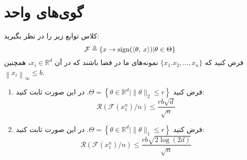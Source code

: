 \section{گوی‌های واحد}
کلاس توابع زیر را در نظر بگیرید:
$$\mathcal{F} \triangleq \{x \to \operatorname*{sign}(\langle\theta, \: x\rangle)| \theta \in \Theta\}$$
فرض کنید که 
$\{x_1. x_2, \hdots, x_n\}$
نمونه‌های ما در فضا باشند که در آن 
$x_i \in \mathbb{R}^d$،
همچنین
$\left\|x_{i}\right\|_{\infty} \leq b$.

\begin{enumerate}
\item 
فرض کنید 
$\Theta=\left\{\theta \in \mathbb{R}^{d} \big|\|\theta\|_{2} \leq r\right\}$.
در این صورت ثابت کنید:
$$\mathcal{R}(\mathcal{F}(x_1^n)/n) \leq \frac{rb\sqrt{d}}{\sqrt{n}}$$ 
\item 
فرض کنید
$\Theta=\left\{\theta \in \mathbb{R}^{d} \big|\|\theta\|_{1} \leq r\right\}$.
در این صورت ثابت کنید:
$$\mathcal{R}(\mathcal{F}(x_1^n)/n) \leq \frac{r b \sqrt{2 \log (2 d)}}{\sqrt{n}}$$ 

\end{enumerate}